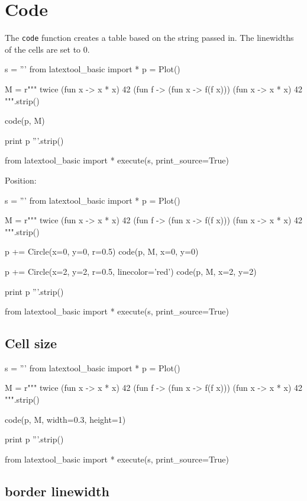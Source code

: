 \section{Code}

The \verb!code! function creates a table based on the string passed in.
The linewidths of the cells are set to 0.

\begin{python}
s = '''
from latextool_basic import *
p = Plot()

M = r"""
twice (fun x -> x * x) 42
(fun f -> (fun x -> f(f x))) (fun x -> x * x) 42
""".strip()
    
code(p, M)

print p
'''.strip()

from latextool_basic import *
execute(s, print_source=True)
\end{python}

\newpage
Position:
\begin{python}
s = '''
from latextool_basic import *
p = Plot()

M = r"""
twice (fun x -> x * x) 42
(fun f -> (fun x -> f(f x))) (fun x -> x * x) 42
""".strip()

p += Circle(x=0, y=0, r=0.5)
code(p, M, x=0, y=0)

p += Circle(x=2, y=2, r=0.5, linecolor='red')
code(p, M, x=2, y=2)

print p
'''.strip()

from latextool_basic import *
execute(s, print_source=True)
\end{python}



\newpage
\subsection{Cell size}
\begin{python}
s = '''
from latextool_basic import *
p = Plot()

M = r"""
twice (fun x -> x * x) 42
(fun f -> (fun x -> f(f x))) (fun x -> x * x) 42
""".strip()
    
code(p, M, width=0.3, height=1)

print p
'''.strip()

from latextool_basic import *
execute(s, print_source=True)
\end{python}




\newpage
\subsection{border linewidth}

